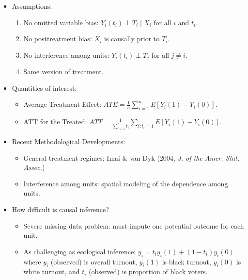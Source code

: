 \documentclass[20pt,landscape,pdftex]{foils}
\begin{document}
\begin{itemize}
\hypersetup{pdfpagetransition=Replace}

\item Assumptions:\pause
  \begin{enumerate}
  \item No omitted variable bias: $Y_i(t_i) \perp T_i \mid X_i$ for
    all $i$ and $t_i$.\pause
  \item No posttreatment bias: $X_i$ is causally prior to $T_i$.\pause
  \item No interference among units: $Y_i(t_i) \perp T_j$ for all $j
    \ne i$.\pause
  \item Same version of treatment.\pause
  \end{enumerate}

\item Quantities of interest:\pause
  \begin{itemize}
    \item Average Treatment Effect: $ATE = \frac{1}{n}\sum_{i=1}^n
      E[Y_i(1) - Y_i(0)].$\pause 
      \bigskip
    \item ATT for the Treated: $ATT = \frac{1}{\sum_{i=1}^n
        t_i}\sum_{i:t_i=1} E[Y_i(1) - Y_i(0)].$\pause
  \end{itemize}

\item Recent Methodological Developments:\pause
  \begin{itemize}
  \item General treatment regimes: Imai \& van Dyk (2004, {\small \it J. of
      the Amer. Stat. Assoc.})\pause
  \item Interference among units: spatial modeling of the dependence
    among units.\pause 
  \end{itemize}

\item How difficult is causal inference?\pause
  \begin{itemize}
  \item Severe missing data problem: must impute one potential outcome for
    each unit.\pause
  \item As challenging as ecological inference: $y_i = t_i y_i(1) +
    (1-t_i) y_i(0)$ where $y_i$ (observed) is overall turnout,
    $y_i(1)$ is black turnout, $y_i(0)$ is white turnout, and $t_i$
    (observed) is proportion of black voters.\pause
  \end{itemize}

\end{itemize}

\end{document}
